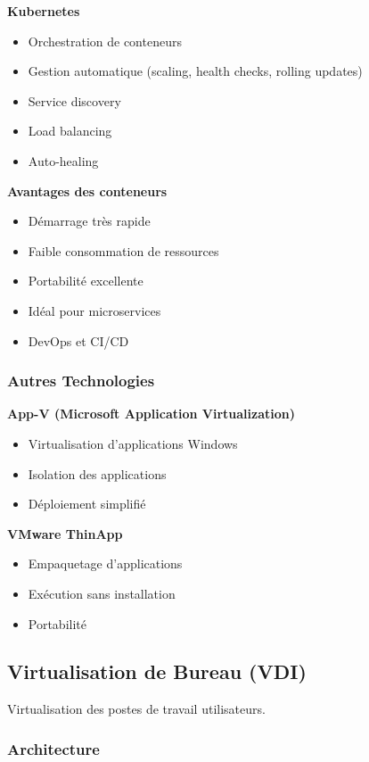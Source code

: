 \documentclass[11pt,a4paper]{article}
\begin{document}
\textbf{Kubernetes}
\begin{itemize}
    \item Orchestration de conteneurs
    \item Gestion automatique (scaling, health checks, rolling updates)
    \item Service discovery
    \item Load balancing
    \item Auto-healing
\end{itemize}

\textbf{Avantages des conteneurs}
\begin{itemize}
    \item Démarrage très rapide
    \item Faible consommation de ressources
    \item Portabilité excellente
    \item Idéal pour microservices
    \item DevOps et CI/CD
\end{itemize}

\subsubsection{Autres Technologies}

\textbf{App-V (Microsoft Application Virtualization)}
\begin{itemize}
    \item Virtualisation d'applications Windows
    \item Isolation des applications
    \item Déploiement simplifié
\end{itemize}

\textbf{VMware ThinApp}
\begin{itemize}
    \item Empaquetage d'applications
    \item Exécution sans installation
    \item Portabilité
\end{itemize}

\subsection{Virtualisation de Bureau (VDI)}

Virtualisation des postes de travail utilisateurs.

\subsubsection{Architecture}
\end{document}
